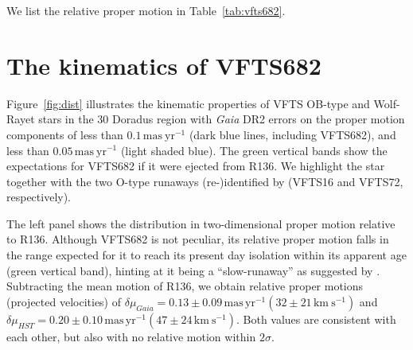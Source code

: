 \documentclass[apjl,twocolumn]{emulateapj}
\newcommand{\kms}{{\,\mathrm{km\ s^{-1}}}}
\newcommand{\masyr}{\,\mathrm{mas}\,\mathrm{yr}^{-1}}
\DeclareRobustCommand{\Tabref}[1]{Table~\ref{#1}}
\begin{document}
We list the relative proper motion in \Tabref{tab:vfts682}. 

\section{The kinematics of VFTS682}
\label{sec:results}

Figure~\ref{fig:dist} illustrates the kinematic properties of VFTS OB-type
and Wolf-Rayet stars in the 30 Doradus region with \emph{Gaia} DR2 errors on the proper motion
components of less than $0.1\,\mathrm{mas\ yr^{-1}}$ (dark blue lines,
including VFTS682), and less than $0.05\,\mathrm{mas\ yr^{-1}}$ (light shaded
blue). The green vertical bands show the expectations for VFTS682 if
it were ejected from R136. We highlight the star together with the two O-type
runaways \mbox{(re-)identified} by \cite{lennon:18} (VFTS16 and VFTS72,
respectively).

The left panel shows the distribution in two-dimensional proper motion relative
to R136. Although VFTS682 is not peculiar, its relative proper motion
falls in the range expected for it to reach its present day isolation
within its apparent age (green vertical band), hinting at it being a ``slow-runaway'' as
suggested by \cite{bestenlehner:11}. Subtracting
the mean motion of R136, we obtain relative proper motions (projected
velocities) of $\delta \mu_{Gaia}=0.13\pm 0.09\masyr (32\pm 21\kms)$ and
$\delta \mu_{HST}=0.20\pm 0.10\masyr (47 \pm 24\kms )$. Both values
are consistent with each other, but also with no relative motion
within $2\sigma$.

\end{document}
